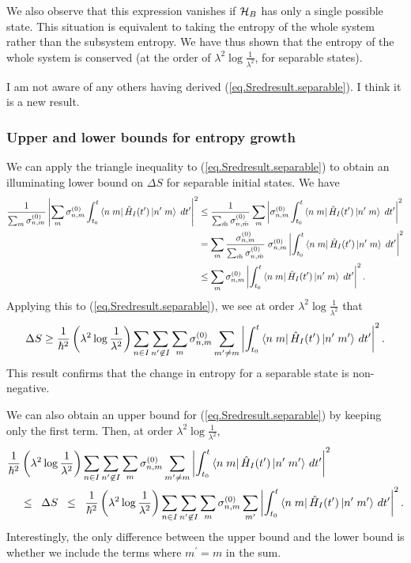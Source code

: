 We also observe that this expression vanishes if \(\mathcal{H}_B\) has only a single possible state. This situation is equivalent to taking the entropy of the whole system rather than the subsystem entropy. We have thus shown that the entropy of the whole system is conserved (at the order of \(\lambda^2 \log\frac{1}{\lambda^2}\), for separable states).

I am not aware of any others having derived (\ref{eq.Sredresult.separable}). I think it is a new result.


\subsubsection{Upper and lower bounds for entropy growth}

We can apply the triangle inequality to (\ref{eq.Sredresult.separable}) to obtain an illuminating lower bound on \(\Delta S\) for separable initial states. We have
\begin{align*}
\frac{1}{\sum_m \sigma_{n,m}^{(0)}} \left|\sum_m{\sigma_{n,m}^{(0)}}\int_{t_0}^t \left\langle n\;m\right| \hat{H}_I(t^\prime) 
 \left|n^\prime\;m\right\rangle\;dt^\prime \right|^2
& \leq \frac{1}{\sum_{\tilde{m}} \sigma_{n,\tilde{m}}^{(0)}} \sum_{m} \left|{\sigma_{n,m}^{(0)}}\int_{t_0}^t \left\langle n\;m\right| \hat{H}_I(t^\prime) 
 \left|n^\prime\;m\right\rangle\;dt^\prime \right|^2 \\
 &= \sum_m \frac{\sigma_{n,m}^{(0)}}{\sum_{\tilde{m}} \sigma_{n,\tilde{m}}^{(0)}} \;\sigma_{n,m}^{(0)} \left|\int_{t_0}^t \left\langle n\;m\right| \hat{H}_I(t^\prime) 
 \left|n^\prime\;m\right\rangle\;dt^\prime \right|^2 \\
 &\leq \sum_m \sigma_{n,m}^{(0)} \left|\int_{t_0}^t \left\langle n\;m\right| \hat{H}_I(t^\prime) 
 \left|n^\prime\;m\right\rangle\;dt^\prime \right|^2.
\end{align*}
Applying this to (\ref{eq.Sredresult.separable}), we see at order \(\lambda^2 \log \frac{1}{\lambda^2}\) that
\[
\Delta S \geq \frac{1}{\hbar^2}\left(\lambda^2 \log\frac{1}{\lambda^2}\right) \sum_{n\in I}\sum_{n^\prime \not\in I} \sum_m \sigma_{n,m}^{(0)} \sum_{m^\prime \neq m} \left|\int_{t_0}^t \left\langle n\;m\right|\hat{H}_I (t^{\prime})\left|n^\prime\;m^\prime\right\rangle \,dt^{\prime}\right|^2.
\]
This result confirms that the change in entropy for a separable state is non-negative.

We can also obtain an upper bound for (\ref{eq.Sredresult.separable}) by keeping only the first term. Then, at order \(\lambda^2 \log \frac{1}{\lambda^2}\),
\begin{align}\label{eq.dSbounds}
\frac{1}{\hbar^2}&\left(\lambda^2 \log\frac{1}{\lambda^2}\right) \sum_{n\in I}\sum_{n^\prime \not\in I} \sum_m \sigma_{n,m}^{(0)} \sum_{m^\prime \neq m} \left|\int_{t_0}^t \left\langle n\;m\right|\hat{H}_I (t^{\prime})\left|n^\prime\;m^\prime\right\rangle \,dt^{\prime}\right|^2 \\
&\leq \;\;\Delta S \;\;\leq\;\; \frac{1}{\hbar^2}\left(\lambda^2 \log\frac{1}{\lambda^2}\right) \sum_{n\in I}\sum_{n^\prime \not\in I} \sum_m \sigma_{n,m}^{(0)} \sum_{m^\prime} \left|\int_{t_0}^t \left\langle n\;m\right|\hat{H}_I (t^{\prime})\left|n^\prime\;m^\prime\right\rangle \,dt^{\prime}\right|^2. \nonumber
\end{align}
Interestingly, the only difference between the upper bound and the lower bound is whether we include the terms where \(m^\prime = m\) in the sum.

